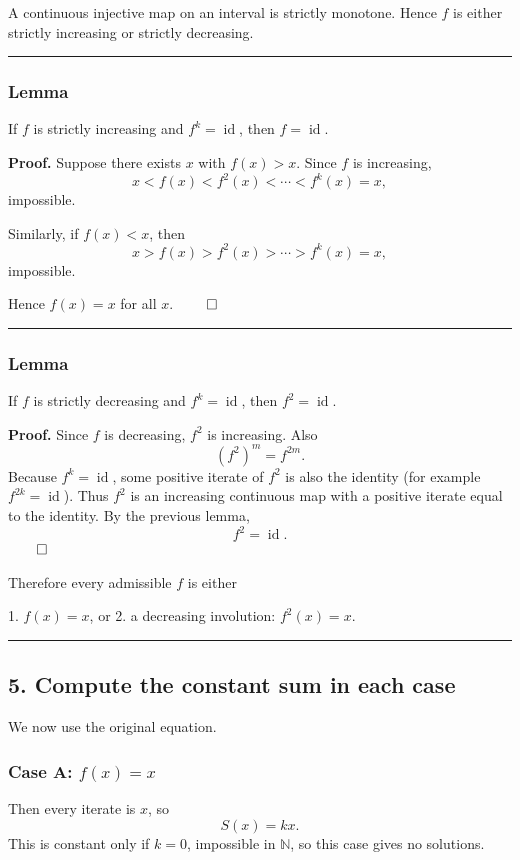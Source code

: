 \documentclass[12pt,a4paper]{article}
\begin{document}
A continuous injective map on an interval is strictly monotone. Hence \(f\) is either strictly increasing or strictly decreasing.


\medskip\hrule\medskip


\subsubsection*{Lemma}
If \(f\) is strictly increasing and \(f^k=\operatorname{id}\), then \(f=\operatorname{id}\).

\textbf{Proof.}
Suppose there exists \(x\) with \(f(x)>x\). Since \(f\) is increasing,
\[
x<f(x)<f^2(x)<\cdots<f^k(x)=x,
\]
impossible.

Similarly, if \(f(x)<x\), then
\[
x>f(x)>f^2(x)>\cdots>f^k(x)=x,
\]
impossible.

Hence \(f(x)=x\) for all \(x\). $\qed$


\medskip\hrule\medskip


\subsubsection*{Lemma}
If \(f\) is strictly decreasing and \(f^k=\operatorname{id}\), then \(f^2=\operatorname{id}\).

\textbf{Proof.}
Since \(f\) is decreasing, \(f^2\) is increasing. Also
\[
(f^2)^m = f^{2m}.
\]
Because \(f^k=\operatorname{id}\), some positive iterate of \(f^2\) is also the identity (for example \(f^{2k}=\operatorname{id}\)). Thus \(f^2\) is an increasing continuous map with a positive iterate equal to the identity. By the previous lemma,
\[
f^2=\operatorname{id}.
\]
$\qed$

Therefore every admissible \(f\) is either

1. \(f(x)=x\), or
2. a decreasing involution: \(f^2(x)=x\).


\medskip\hrule\medskip


\subsection*{5. Compute the constant sum in each case}

We now use the original equation.

\subsubsection*{Case A: \(f(x)=x\)}

Then every iterate is \(x\), so
\[
S(x)=kx.
\]
This is constant only if \(k=0\), impossible in \(\mathbb N\), so this case gives no solutions.
\end{document}
